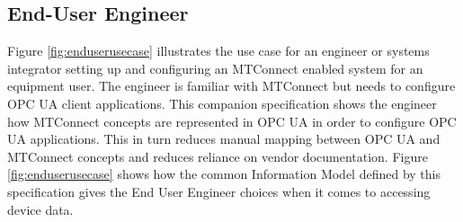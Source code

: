 
\FloatBarrier

\subsection{End-User Engineer}

Figure \ref{fig:enduserusecase} illustrates the use case for an engineer or systems integrator setting up and configuring an MTConnect enabled system for an equipment user. The engineer is familiar with MTConnect but needs to configure OPC UA client applications. This companion specification shows the engineer how MTConnect concepts are represented in OPC UA in order to configure OPC UA applications. This in turn reduces manual mapping between OPC UA and MTConnect concepts and reduces reliance on vendor documentation. Figure \ref{fig:enduserusecase} shows how the common Information Model defined by this specification gives the End User Engineer choices when it comes to accessing device data.


\FloatBarrier
